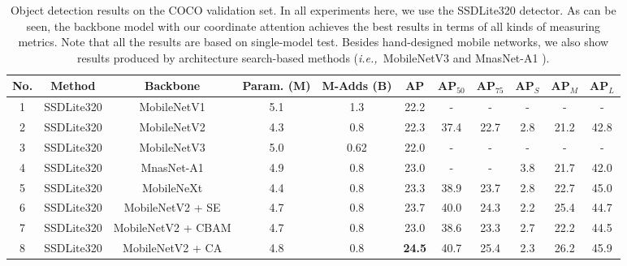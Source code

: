\documentclass[final]{cvpr}
\def\ie{\emph{i.e.,~}}
\begin{document}
\begin{table}[t]
    \centering
    \small
    \setlength\tabcolsep{2.5mm}
    \renewcommand{\arraystretch}{1.2}
    \caption{Object detection results on the COCO validation set. 
    In all experiments here, we use the SSDLite320 detector. As can be seen, the backbone
    model with our coordinate attention 
    achieves the best results in terms of all kinds of measuring metrics.
    Note that all the results are based on
    single-model test.
    Besides hand-designed mobile networks, we
    also show results produced by architecture search-based methods (\ie MobileNetV3 \cite{howard2019searching} and MnasNet-A1 \cite{tan2019mnasnet}).}
    \begin{tabular}{ccccccccccc} \toprule[1pt] %
        No. & Method & Backbone & Param. (M) & M-Adds (B) & AP & AP$_{50}$ & AP$_{75}$ & AP$_{S}$ & AP$_{M}$ & AP$_{L}$ \\ \midrule[1pt]
        1 & SSDLite320  & MobileNetV1 \cite{howard2017mobilenets} & 5.1 & 1.3 & 22.2 & - & - & - & - & - \\
        2 & SSDLite320  & MobileNetV2 \cite{sandler2018mobilenetv2} & 4.3 & 0.8 & 22.3 & 37.4 & 22.7 & 2.8 & 21.2 & 42.8 \\
        3 & SSDLite320  & MobileNetV3 \cite{howard2019searching} & 5.0 & 0.62 & 22.0 & - & - & - & - & - \\
        4 & SSDLite320 & MnasNet-A1 \cite{tan2019mnasnet} & 4.9 & 0.8 & 23.0 & - & - &  3.8 & 21.7 &  42.0 \\
        5 & SSDLite320  & MobileNeXt \cite{daquan2020rethinking} & 4.4 & 0.8 & 23.3 & 38.9 & 23.7 & 2.8 & 22.7 & 45.0 \\ \midrule[1pt]
        6 & SSDLite320  & MobileNetV2 + SE & 4.7 & 0.8 & 23.7 & 40.0 & 24.3 & 2.2 & 25.4 & 44.7 \\ 
        7 & SSDLite320  & MobileNetV2 + CBAM & 4.7 & 0.8 & 23.0 & 38.6 & 23.3 & 2.7 & 22.2 & 44.5 \\ 
        8 & SSDLite320  & MobileNetV2 + CA & 4.8 & 0.8 & \textbf{24.5} & 40.7 & 25.4 & 2.3 & 26.2 & 45.9 \\ 
        \bottomrule[1.0pt]
        \end{tabular}
        \label{tab:coco_detection}
\end{table}
\end{document}
